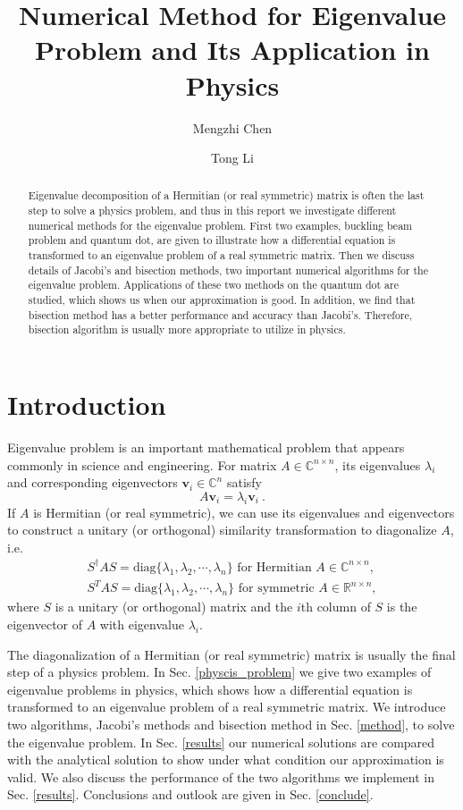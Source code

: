 \documentclass{article}
\title{Numerical Method for Eigenvalue Problem and Its Application in Physics}
\author[1]{Mengzhi Chen}
\author[1]{Tong Li}
\affil[1]{Department of Physics and Astronomy, Michigan State University}
\date{}
\begin{document}
	\maketitle
	\begin{abstract}\label{abstract}
Eigenvalue decomposition of a Hermitian (or real symmetric) matrix is often the last step to solve a physics problem, and thus 
in this report we investigate different numerical methods for the eigenvalue problem. 
First two examples, buckling beam problem and quantum dot, are given to illustrate how a differential equation is transformed 
to an eigenvalue problem of a real symmetric matrix. 
Then we discuss details of Jacobi's and bisection methods, two important numerical algorithms for the eigenvalue problem. 
Applications of these two methods on the quantum dot are studied, which shows us when our approximation is good. 
In addition, we find that bisection method has a better performance and accuracy than Jacobi's. 
Therefore, bisection algorithm is usually more appropriate to utilize in physics. 
	\end{abstract}

	\section{Introduction}\label{intro}
Eigenvalue problem is an important mathematical problem that appears commonly in science and engineering. 
For matrix $A\in\mathbb{C}^{n \times n}$, its eigenvalues $\lambda_i$ and corresponding eigenvectors $\mathbf{v}_i\in\mathbb{C}^n$ satisfy
\begin{equation}
A\mathbf{v}_i=\lambda_i \mathbf{v}_i\ .
\end{equation}
If $A$ is Hermitian (or real symmetric), we can use its eigenvalues and eigenvectors to construct a unitary (or orthogonal) 
similarity transformation to diagonalize $A$, i.e. 
\begin{eqnarray}
S^{\dagger}AS=\text{diag}\{\lambda_1,\lambda_2,\cdots,\lambda_n\}\text{ for Hermitian }A\in\mathbb{C}^{n\times n}, \\
S^{T}AS=\text{diag}\{\lambda_1,\lambda_2,\cdots,\lambda_n\}\text{ for symmetric }A\in\mathbb{R}^{n\times n},
\end{eqnarray}
where $S$ is a unitary (or orthogonal) matrix and the $i$th column of $S$ is the eigenvector of $A$ with eigenvalue $\lambda_i$. 
\par
The diagonalization of a Hermitian (or real symmetric) matrix is usually the final step of a physics problem. 
In Sec. \ref{physcis_problem} we give two examples of eigenvalue problems in physics, which shows how a differential equation 
is transformed to an eigenvalue problem of a real symmetric matrix. 
We introduce two algorithms, Jacobi's methods and bisection method in Sec. \ref{method}, to solve the eigenvalue problem. 
In Sec. \ref{results} our numerical solutions are compared with the analytical solution 
to show under what condition our approximation is valid. 
We also discuss the performance of the two algorithms we implement in Sec. \ref{results}. 
Conclusions and outlook are given in Sec. \ref{conclude}. 
	
\end{document}

